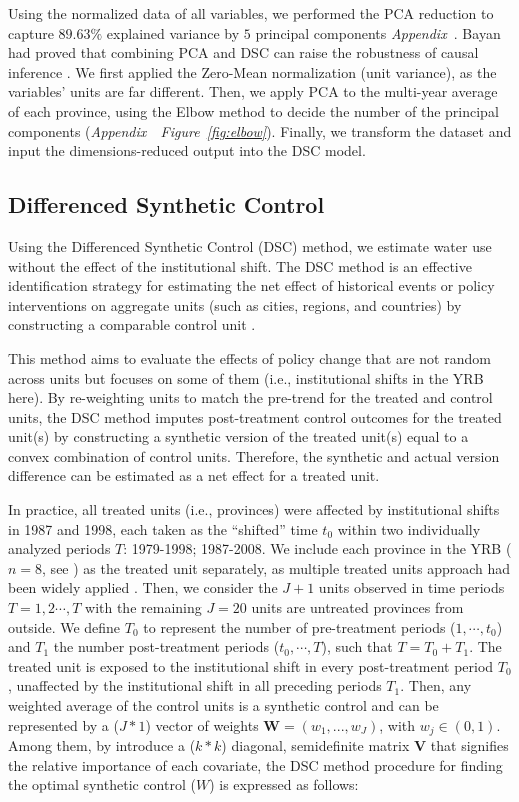 \documentclass[default, sn-standardnature]{sn-jnl}
\begin{document}
Using the normalized data of all variables, we performed the PCA reduction to capture $89.63\%$ explained variance by $5$ principal components \textit{Appendix~}. Bayan had proved that combining PCA and DSC can raise the robustness of causal inference \cite{bayani2021}. We first applied the Zero-Mean normalization (unit variance), as the variables' units are far different. Then, we apply PCA to the multi-year average of each province, using the Elbow method to decide the number of the principal components (\textit{Appendix~~Figure~\ref{fig:elbow}}). Finally, we transform the dataset and input the dimensions-reduced output into the DSC model.


\subsection{Differenced Synthetic Control}\label{sec:DSC}
Using the Differenced Synthetic Control (DSC) method, we estimate water use without the effect of the institutional shift.
The DSC method is an effective identification strategy for estimating the net effect of historical events or policy interventions on aggregate units (such as cities, regions, and countries) by constructing a comparable control unit \cite{abadie2010, abadie2015, hill2021}.

This method aims to evaluate the effects of policy change that are not random across units but focuses on some of them (i.e., institutional shifts in the YRB here).
By re-weighting units to match the pre-trend for the treated and control units, the DSC method imputes post-treatment control outcomes for the treated unit(s) by constructing a synthetic version of the treated unit(s) equal to a convex combination of control units.
Therefore, the synthetic and actual version difference can be estimated as a net effect for a treated unit.

In practice, all treated units (i.e., provinces) were affected by institutional shifts in 1987 and 1998, each taken as the ``shifted'' time $t_0$ within two individually analyzed periods $T$: 1979-1998; 1987-2008.
We include each province in the YRB ($n=8$, see \textit{}) as the treated unit separately, as multiple treated units approach had been widely applied \cite{abadie2021}.
Then, we consider the $J+1$ units observed in time periods $T = {1,2 \cdots , T}$ with the remaining $J=20$ units are untreated provinces from outside.
We define $T_0$ to represent the number of pre-treatment periods ($1,\cdots,t_0$) and $T_1$ the number post-treatment periods ($t_0,\cdots,T$), such that $T = T_0+ T_1$.
The treated unit is exposed to the institutional shift in every post-treatment period $T_0$, unaffected by the institutional shift in all preceding periods $T_1$.
Then, any weighted average of the control units is a synthetic control and can be represented by a ($J * 1$) vector of weights $\mathbf{W} = (w_{1},...,w_{J})$, with $w_j \in (0, 1)$.
Among them, by introduce a ($k * k$) diagonal, semidefinite matrix $\mathbf{V}$ that signifies the relative importance of each covariate, the DSC method procedure for finding the optimal synthetic control ($W$) is expressed as follows:
\end{document}
